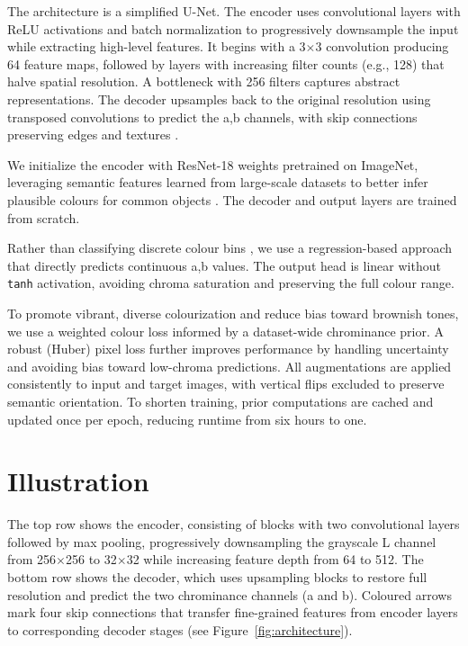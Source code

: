 \documentclass{article} %
\begin{document}
The architecture is a simplified U-Net. The encoder uses convolutional layers with ReLU activations and batch normalization to progressively downsample the input while extracting high-level 
features. It begins with a 3$\times$3 convolution producing 64 feature maps, followed by layers with increasing filter counts (e.g., 128) that halve spatial resolution. A bottleneck with 256 
filters captures abstract representations. The decoder upsamples back to the original resolution using transposed convolutions to predict the a,b channels, with skip connections preserving 
edges and textures \citep{leatvanich2025image}.

We initialize the encoder with ResNet-18 weights pretrained on ImageNet, leveraging semantic features learned from large-scale datasets to better infer plausible colours for common objects 
\citep{olah2022lettherebecolor}. The decoder and output layers are trained from scratch.

Rather than classifying discrete colour bins \citep{olah2022lettherebecolor}, we use a regression-based approach that directly predicts continuous a,b values. The output head is linear without 
\verb|tanh| activation, avoiding chroma saturation and preserving the full colour range.

To promote vibrant, diverse colourization and reduce bias toward brownish tones, we use a weighted colour loss informed by a dataset-wide chrominance prior. A robust (Huber) pixel loss further 
improves performance by handling uncertainty and avoiding bias toward low-chroma predictions. All augmentations are applied consistently to input and target images, with vertical flips excluded 
to preserve semantic orientation. To shorten training, prior computations are cached and updated once per epoch, reducing runtime from six hours to one.

\section{Illustration}

The top row shows the encoder, consisting of blocks with two convolutional layers followed by max pooling, progressively downsampling the grayscale L channel from 256$\times$256 to 
32$\times$32 while increasing feature depth from 64 to 512. The bottom row shows the decoder, which uses upsampling blocks to restore full resolution and predict the two chrominance channels 
(a and b). Coloured arrows mark four skip connections that transfer fine-grained features from encoder layers to corresponding decoder stages (see Figure~\ref{fig:architecture}).
\end{document}
